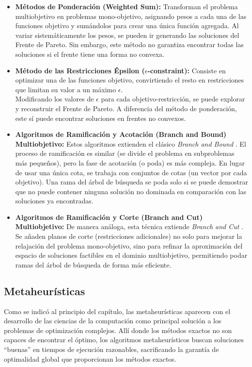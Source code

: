 \documentclass[12pt,a4paper]{book}
\begin{document}
\begin{itemize}
    \item \textbf{Métodos de Ponderación (Weighted Sum):} Transforman el problema multiobjetivo en problemas mono-objetivo, asignando pesos a cada una de las funciones objetivo y sumándolos para crear una única función agregada. Al variar sistemáticamente los pesos, se pueden ir generando las soluciones del Frente de Pareto. Sin embargo, este método no garantiza encontrar todas las soluciones si el frente tiene una forma no convexa.

    \item \textbf{Método de las Restricciones Épsilon ($\epsilon$-constraint):} Consiste en optimizar una de las funciones objetivo, convirtiendo el resto en restricciones que limitan su valor a un máximo $\epsilon$.\\
    Modificando los valores de $\epsilon$ para cada objetivo-restricción, se puede explorar y reconstruir el Frente de Pareto. A diferencia del método de ponderación, este sí puede encontrar soluciones en frentes no convexos.

    \item \textbf{Algoritmos de Ramificación y Acotación (Branch and Bound) Multiobjetivo:} Estos algoritmos extienden el clásico \textit{Branch and Bound} \citep{bnb}. El proceso de ramificación es similar (se divide el problema en subproblemas más pequeños), pero la fase de acotación (o poda) es más compleja. En lugar de usar una única cota, se trabaja con conjuntos de cotas (un vector por cada objetivo). Una rama del árbol de búsqueda se poda solo si se puede demostrar que no puede contener ninguna solución no dominada en comparación con las soluciones ya encontradas.

    \item \textbf{Algoritmos de Ramificación y Corte (Branch and Cut) Multiobjetivo:} De manera análoga, esta técnica extiende \textit{Branch and Cut} \citep{bnc}. Se añaden planos de corte (restricciones adicionales) no solo para mejorar la relajación del problema mono-objetivo, sino para refinar la aproximación del espacio de soluciones factibles en el dominio multiobjetivo, permitiendo podar ramas del árbol de búsqueda de forma más eficiente.
\end{itemize}

\subsection{Metaheurísticas}
Como se indicó al principio del capítulo, las metaheurísticas \citep{metaheuristicos} aparecen con el desarrollo de las ciencias de la computación como principal solución a los problemas de optimización complejos. Allí donde los métodos exactos no son capaces de encontrar el óptimo,
los algoritmos metaheurísticos buscan soluciones ``buenas'' en tiempos de ejecución razonables, sacrificando la garantía de optimalidad global que proporcionan los métodos exactos.
\end{document}

